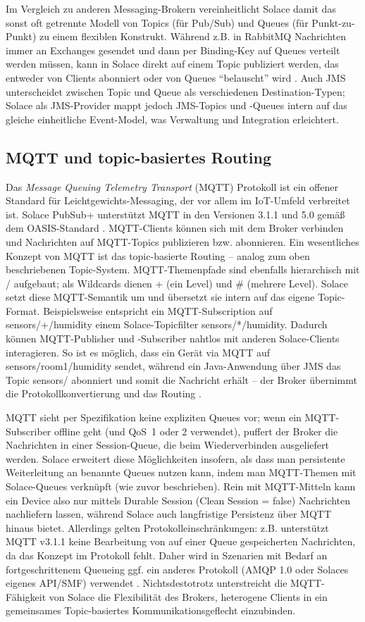 Im Vergleich zu anderen Messaging-Brokern vereinheitlicht Solace damit das sonst oft getrennte Modell von Topics (für Pub/Sub) und Queues (für Punkt-zu-Punkt) zu einem flexiblen Konstrukt. Während z.B. in RabbitMQ Nachrichten immer an Exchanges gesendet und dann per Binding-Key auf Queues verteilt werden müssen, kann in Solace direkt auf einem Topic publiziert werden, das entweder von Clients abonniert oder von Queues “belauscht” wird \cite{SolaceTopicWildcard}. Auch JMS unterscheidet zwischen Topic und Queue als verschiedenen Destination-Typen; Solace als JMS-Provider mappt jedoch JMS-Topics und -Queues intern auf das gleiche einheitliche Event-Model, was Verwaltung und Integration erleichtert.

\subsection{MQTT und topic-basiertes Routing}

Das \textit{Message Queuing Telemetry Transport} (MQTT) Protokoll ist ein offener Standard für Leichtgewichts-Messaging, der vor allem im IoT-Umfeld verbreitet ist. Solace PubSub+ unterstützt MQTT in den Versionen 3.1.1 und 5.0 gemäß dem OASIS-Standard \cite{SolaceMQTT}. MQTT-Clients können sich mit dem Broker verbinden und Nachrichten auf MQTT-Topics publizieren bzw. abonnieren. Ein wesentliches Konzept von MQTT ist das topic-basierte Routing – analog zum oben beschriebenen Topic-System. MQTT-Themenpfade sind ebenfalls hierarchisch mit / aufgebaut; als Wildcards dienen + (ein Level) und \# (mehrere Level). Solace setzt diese MQTT-Semantik um und übersetzt sie intern auf das eigene Topic-Format. Beispielsweise entspricht ein MQTT-Subscription auf sensors/+/humidity einem Solace-Topicfilter sensors/*/humidity. Dadurch können MQTT-Publisher und -Subscriber nahtlos mit anderen Solace-Clients interagieren. So ist es möglich, dass ein Gerät via MQTT auf sensors/room1/humidity sendet, während ein Java-Anwendung über JMS das Topic sensors/\> abonniert und somit die Nachricht erhält – der Broker übernimmt die Protokollkonvertierung und das Routing \cite{SolaceProtocols}.

MQTT sieht per Spezifikation keine expliziten Queues vor; wenn ein MQTT-Subscriber offline geht (und QoS 1 oder 2 verwendet), puffert der Broker die Nachrichten in einer Session-Queue, die beim Wiederverbinden ausgeliefert werden. Solace erweitert diese Möglichkeiten insofern, als dass man persistente Weiterleitung an benannte Queues nutzen kann, indem man MQTT-Themen mit Solace-Queues verknüpft (wie zuvor beschrieben). Rein mit MQTT-Mitteln kann ein Device also nur mittels Durable Session (Clean Session = false) Nachrichten nachliefern lassen, während Solace auch langfristige Persistenz über MQTT hinaus bietet. Allerdings gelten Protokolleinschränkungen: z.B. unterstützt MQTT v3.1.1 keine Bearbeitung von auf einer Queue gespeicherten Nachrichten, da das Konzept im Protokoll fehlt. Daher wird in Szenarien mit Bedarf an fortgeschrittenem Queueing ggf. ein anderes Protokoll (AMQP 1.0 oder Solaces eigenes API/SMF) verwendet \cite{SolaceDaprMQTT}. Nichtsdestotrotz unterstreicht die MQTT-Fähigkeit von Solace die Flexibilität des Brokers, heterogene Clients in ein gemeinsames Topic-basiertes Kommunikationsgeflecht einzubinden.

